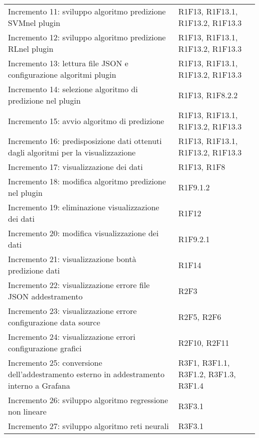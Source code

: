 \begin{longtable} {
		>{\raggedright\arraybackslash}p{85mm}
		>{\raggedleft\arraybackslash}p{40mm}
	}
	Incremento 11: sviluppo algoritmo predizione SVM\glosp nel plugin &
	R1F13, R1F13.1, R1F13.2, R1F13.3 \TBstrut \\ [2mm]
	
	Incremento 12: sviluppo algoritmo predizione RL\glosp nel plugin &
	R1F13, R1F13.1, R1F13.2, R1F13.3 \TBstrut \\ [2mm]
	
	Incremento 13: lettura file JSON e configurazione algoritmi plugin &
	R1F13, R1F13.1, R1F13.2, R1F13.3 \TBstrut \\ [2mm]
	
	Incremento 14: selezione algoritmo di predizione nel plugin &
	R1F13, R1F8.2.2 \TBstrut \\ [2mm]
	
	Incremento 15: avvio algoritmo di predizione &
	R1F13, R1F13.1, R1F13.2, R1F13.3 \TBstrut \\ [2mm]
	
	Incremento 16: predisposizione dati ottenuti dagli algoritmi per la visualizzazione &
	R1F13, R1F13.1, R1F13.2, R1F13.3 \TBstrut \\ [2mm]
	
	Incremento 17: visualizzazione dei dati &
	R1F13, R1F8 \TBstrut \\ [2mm]
	
	Incremento 18: modifica algoritmo predizione nel plugin &
	R1F9.1.2 \TBstrut \\ [2mm]
	
	Incremento 19: eliminazione visualizzazione dei dati &
	R1F12 \TBstrut \\ [2mm]
	
	Incremento 20: modifica visualizzazione dei dati &
	R1F9.2.1 \TBstrut \\ [2mm]
	
	Incremento 21: visualizzazione bontà predizione dati &
	R1F14 \TBstrut \\ [2mm]
	
	Incremento 22: visualizzazione errore file JSON addestramento &
	R2F3 \TBstrut \\ [2mm]
	
	Incremento 23: visualizzazione errore configurazione data source &
	R2F5, R2F6 \TBstrut \\ [2mm]
	
	Incremento 24: visualizzazione errori configurazione grafici &
	R2F10, R2F11 \TBstrut \\ [2mm]
	
	Incremento 25: conversione dell'addestramento esterno in addestramento interno a Grafana\glosp &
	R3F1, R3F1.1, R3F1.2, R3F1.3, R3F1.4 \TBstrut \\ [2mm]
	
	Incremento 26: sviluppo algoritmo regressione non lineare &
	R3F3.1 \TBstrut \\ [2mm]
	
	Incremento 27: sviluppo algoritmo reti neurali &
	R3F3.1 \TBstrut \\ [2mm]
	
\end{longtable}

